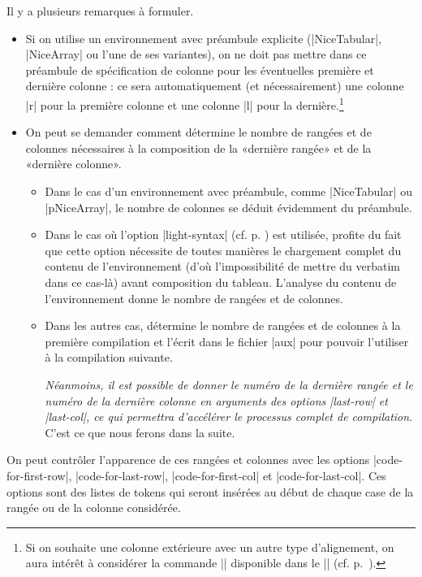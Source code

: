 \documentclass[dvipsnames]{article}%
\begin{document}
\medskip
Il y a plusieurs remarques à formuler.
%
\begin{itemize}[beginpenalty=10000]
\item Si on utilise un environnement avec préambule explicite (|{NiceTabular}|,
|{NiceArray}| ou l'une de ses variantes), on ne doit pas mettre dans ce
préambule de spécification de colonne pour les éventuelles première et dernière
colonne : ce sera automatiquement (et nécessairement) une colonne |r| pour la
première colonne et une colonne |l| pour la dernière.\footnote{Si on souhaite
  une colonne extérieure avec un autre type d'alignement, on aura intérêt à
  considérer la commande |\SubMatrix| disponible dans le |\CodeAfter|
  (cf. p.~\pageref{sub-matrix}).}

\item On peut se demander comment  détermine le nombre de rangées et de colonnes nécessaires à la
composition de la «dernière rangée» et de la «dernière colonne».

\begin{itemize}
\item Dans le cas d'un environnement avec préambule, comme |{NiceTabular}| ou
|{pNiceArray}|, le nombre de colonnes se déduit évidemment du préambule.

\item Dans le cas où l'option |light-syntax| (cf. p. \pageref{light-syntax}) est
utilisée,  profite du fait que cette option nécessite de toutes
manières le chargement complet du contenu de l'environnement (d'où
l'impossibilité de mettre du verbatim dans ce cas-là) avant composition du
tableau. L'analyse du contenu de l'environnement donne le nombre de rangées
et de colonnes.

\item Dans les autres cas,  détermine le nombre de rangées et de
colonnes à la première compilation et l'écrit dans le fichier |aux| pour
pouvoir l'utiliser à la compilation suivante.

\textsl{Néanmoins, il est possible de donner le numéro de la dernière rangée et
  le numéro de la dernière colonne en arguments des options |last-row| et
  |last-col|, ce qui permettra d'accélérer le processus complet de compilation.}
C'est ce que nous ferons dans la suite.
\end{itemize}

\end{itemize}



\medskip
On peut contrôler l'apparence de ces rangées et colonnes avec les options
|code-for-first-row|, |code-for-last-row|, |code-for-first-col| et
|code-for-last-col|. Ces options sont des listes de tokens qui seront insérées
au début de chaque case de la rangée ou de la colonne considérée.
\end{document}
